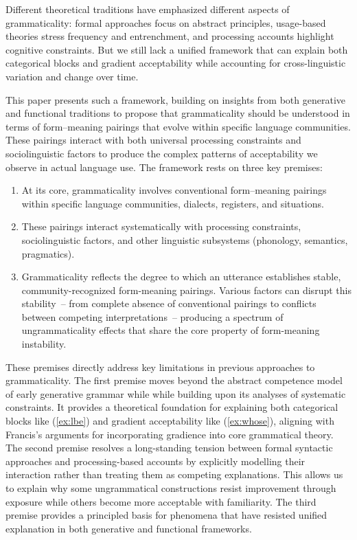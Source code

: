 \documentclass[12pt,letterpaper]{article}
\begin{document}
Different theoretical traditions have emphasized different aspects of grammaticality: formal approaches focus on abstract principles, usage-based theories stress frequency and entrenchment, and processing accounts highlight cognitive constraints. But we still lack a unified framework that can explain both categorical blocks and gradient acceptability while accounting for cross-linguistic variation and change over time.

This paper presents such a framework, building on insights from both generative and functional traditions to propose that grammaticality should be understood in terms of form--meaning pairings that evolve within specific language communities. These pairings interact with both universal processing constraints and sociolinguistic factors to produce the complex patterns of acceptability we observe in actual language use. The framework rests on three key premises:

\begin{enumerate}
\item At its core, grammaticality involves conventional form--meaning pairings within specific language communities, dialects, registers, and situations.
\item These pairings interact systematically with processing constraints, sociolinguistic factors, and other linguistic subsystems (phonology, semantics, pragmatics).
\item Grammaticality reflects the degree to which an utterance establishes stable, community-recognized form-meaning pairings. Various factors can disrupt this stability~-- from complete absence of conventional pairings to conflicts between competing interpretations~-- producing a spectrum of ungrammaticality effects that share the core property of form-meaning instability.
\end{enumerate}

These premises directly address key limitations in previous approaches to grammaticality. The first premise moves beyond the abstract competence model of early generative grammar while while building upon its analyses of systematic constraints. It provides a theoretical foundation for explaining both categorical blocks like (\ref{ex:lbe}) and gradient acceptability like (\ref{ex:whose}), aligning with Francis's \autocite{francis2022} arguments for incorporating gradience into core grammatical theory. The second premise resolves a long-standing tension between formal syntactic approaches and processing-based accounts by explicitly modelling their interaction rather than treating them as competing explanations. This allows us to explain why some ungrammatical constructions resist improvement through exposure while others become more acceptable with familiarity. The third premise provides a principled basis for phenomena that have resisted unified explanation in both generative and functional frameworks.
\end{document}
